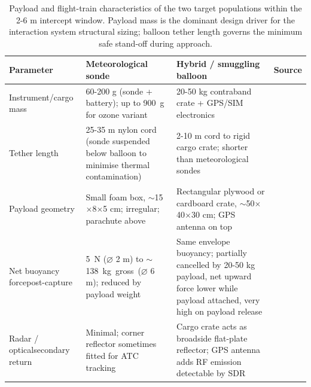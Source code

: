 \begin{table}[H]
\centering
\caption{Payload and flight-train characteristics of the two target populations within the 2-6 m intercept window. Payload mass is the dominant design driver for the interaction system structural sizing; balloon tether length governs the minimum safe stand-off during approach.}
\label{tab:payload_form}
\small
\begin{tabular}{@{}p{2.4cm}p{5.2cm}p{5.2cm}p{1.6cm}@{}}
\toprule
\textbf{Parameter} &
  \textbf{Meteorological sonde} &
  \textbf{Hybrid / smuggling balloon} &
  \textbf{Source} \\
\midrule
Instrument/cargo mass & 60-200 g (sonde + battery); up to \SI{900}{\gram} for ozone variant & 20-50 kg contraband crate + GPS/SIM electronics & \cite{NOAANationalWeatherService2024RadiosondeSheet, AMOF/NCASVaisalaHandbook} \\[4pt]
 
Tether length & 25-35 m nylon cord (sonde suspended below balloon to minimise thermal contamination) & 2-10 m cord to rigid cargo crate; shorter than meteorological sondes & \cite{CounciloftheEuropeanUnion2025Belarus:States, NOAANationalWeatherService2024RadiosondeSheet, WTAQ2025Factbox:Lithuania} \\[4pt]
 
Payload geometry & Small foam box, $\sim$15$\times$8$\times$5 cm; irregular; parachute above & Rectangular plywood or cardboard crate, $\sim$50$\times$40$\times$30 cm; GPS antenna on top & \cite{NOAANationalWeatherService2024RadiosondeSheet, WTAQ2025Factbox:Lithuania} \\[4pt]
 
Net buoyancy force\newline post-capture & \SI{5}{\newton} ($\varnothing$ 2 m) to $\sim$\SI{138}kg gross ($\varnothing$ 6 m); reduced by payload weight & Same envelope buoyancy; partially cancelled by 20-50 kg payload, net upward force lower while payload attached, very high on payload release\\[4pt]
 
Radar / optical\newline secondary return & Minimal; corner reflector sometimes fitted for ATC tracking & Cargo crate acts as broadside flat-plate reflector; GPS antenna adds RF emission detectable by SDR & \cite{WTAQ2025Factbox:Lithuania, EuromaidanPress2025PolandEve} \\
\bottomrule
\end{tabular}
\end{table}
